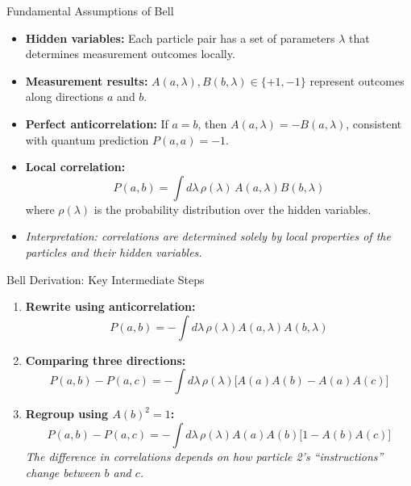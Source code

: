 \begin{frame}{Fundamental Assumptions of Bell}

\begin{itemize}
  \item \textbf{Hidden variables:} Each particle pair has a set of parameters $\lambda$ that determines measurement outcomes locally. \pause
  \item \textbf{Measurement results:} $A(a,\lambda), B(b,\lambda) \in \{+1,-1\}$ represent outcomes along directions $a$ and $b$. \pause
  \item \textbf{Perfect anticorrelation:} If $a=b$, then $A(a,\lambda) = -B(a,\lambda)$, consistent with quantum prediction $P(a,a)=-1$. \pause
  \item \textbf{Local correlation:}
  \[
    P(a,b) = \int d\lambda\, \rho(\lambda)\, A(a,\lambda) B(b,\lambda)
  \]
  where $\rho(\lambda)$ is the probability distribution over the hidden variables. \pause
  \item \textit{Interpretation: correlations are determined solely by local properties of the particles and their hidden variables.}
\end{itemize}

\end{frame}

\begin{frame}{Bell Derivation: Key Intermediate Steps}

\begin{enumerate}
  \item \textbf{Rewrite using anticorrelation:}
  \[
    P(a,b) = - \int d\lambda\, \rho(\lambda) A(a,\lambda) A(b,\lambda)
  \]

  \item \textbf{Comparing three directions:}
  \[
    P(a,b)-P(a,c) = - \int d\lambda\, \rho(\lambda) \big[ A(a)A(b) - A(a)A(c) \big]
  \] \pause

  \item \textbf{Regroup using $A(b)^2=1$:}
  \[
    P(a,b)-P(a,c) = - \int d\lambda\, \rho(\lambda) A(a)A(b) \big[ 1 - A(b)A(c) \big]
  \]
  \textit{The difference in correlations depends on how particle 2’s “instructions” change between $b$ and $c$.}
\end{enumerate}

\end{frame}

